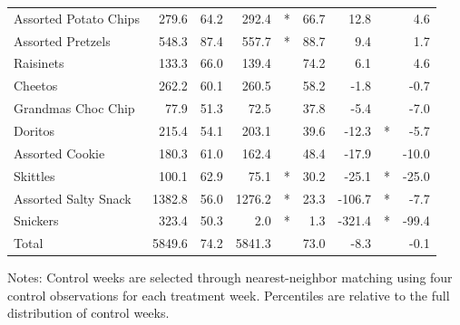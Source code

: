 \documentclass[aspectratio=169,11pt]{beamer}
\begin{document}
\begin{frame}
\begin{table}
\begin{center}
\begin{tabular}{|l|rrrcrrcr|}
Assorted Potato Chips&279.6&64.2&292.4&\hspace{-0.3in}*&66.7&12.8& \hspace{-0.3in}&4.6\\
Assorted Pretzels&548.3&87.4&557.7&\hspace{-0.3in}*&88.7&9.4& \hspace{-0.3in}&1.7\\
Raisinets&133.3&66.0&139.4& \hspace{-0.3in}&74.2&6.1& \hspace{-0.3in}&4.6\\
Cheetos&262.2&60.1&260.5& \hspace{-0.3in}&58.2&-1.8& \hspace{-0.3in}&-0.7\\
Grandmas Choc Chip&77.9&51.3&72.5& \hspace{-0.3in}&37.8&-5.4& \hspace{-0.3in}&-7.0\\
Doritos&215.4&54.1&203.1& \hspace{-0.3in}&39.6&-12.3& \hspace{-0.3in}*&-5.7\\
Assorted Cookie&180.3&61.0&162.4& \hspace{-0.3in}&48.4&-17.9& \hspace{-0.3in}&-10.0\\
Skittles&100.1&62.9&75.1&\hspace{-0.3in}*&30.2&-25.1& \hspace{-0.3in}*&-25.0\\
Assorted Salty Snack&1382.8&56.0&1276.2&\hspace{-0.3in}*&23.3&-106.7& \hspace{-0.3in}*&-7.7\\
Snickers&323.4&50.3&2.0&\hspace{-0.3in}*&1.3&-321.4& \hspace{-0.3in}*&-99.4\\ \hline
Total&5849.6&74.2&5841.3& \hspace{-0.3in}&73.0&-8.3& \hspace{-0.3in}&-0.1\\
\hline\end{tabular}
\end{center}
\tiny
Notes: Control weeks are selected through nearest-neighbor matching using four control observations for each treatment week.  Percentiles are relative to the full distribution of control weeks.
\end{table}
\end{frame}
\end{document}
